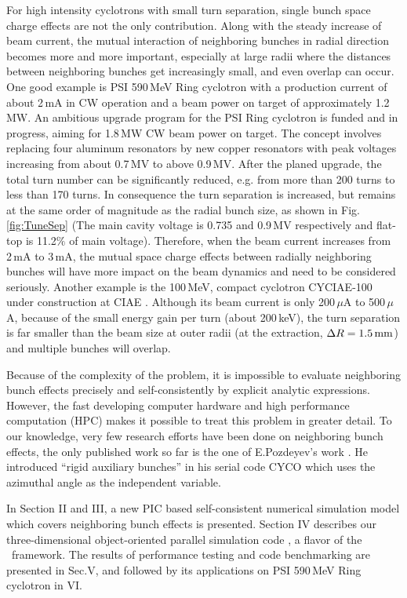 \documentclass[aps,prstab,twocolumn,superscriptaddress]{revtex4}
\begin{document}
For high intensity cyclotrons with small turn separation, single bunch space charge effects are not the only contribution. 
Along with the steady increase of beam current, the mutual interaction of neighboring bunches in radial direction 
becomes more and more important, especially at large radii where the distances between neighboring bunches get increasingly small, and even overlap can occur.
One good example is PSI 590\,MeV Ring cyclotron \cite{Mike:1} with a production current of about 2\,mA in CW operation and a beam power on target of approximately 1.2\,MW.
An ambitious upgrade program for the PSI Ring cyclotron is funded and in progress, aiming for 1.8\,MW CW beam power on target. 
The concept involves replacing four aluminum resonators by new copper resonators with peak voltages
increasing from about 0.7\,MV to above 0.9\,MV. After the planed upgrade, the total turn number can be significantly reduced, e.g. from more than 200 turns to less than 
170 turns.
In consequence the turn separation is increased, but remains at the same order of magnitude as the radial bunch size, as shown in Fig.\,\ref{fig:TuneSep} (The main cavity voltage is 0.735 and 0.9\,MV respectively and
      flat-top is 11.2$\%$ of main voltage).
Therefore, when the beam current increases from 2\,mA to 3\,mA, 
the mutual space charge effects between radially neighboring bunches will have more impact on the beam dynamics and need to be considered seriously.
Another example is the 100\,MeV, compact cyclotron CYCIAE-100 under construction at CIAE \cite{Zhang:1}. Although its beam current is only 200\,$\mu$A to 500\,$\mu$A,
because of the small energy gain per turn (about 200\,keV), the turn separation is far smaller than the beam size at outer radii (at the extraction, $\Delta R = 1.5\RM{\,mm}$) and
multiple bunches will overlap.

Because of the complexity of the problem, it is impossible to evaluate neighboring bunch effects precisely and self-consistently by explicit 
analytic expressions. However, the fast developing computer hardware and high performance computation (HPC) makes it possible to 
treat this problem in greater detail. To our knowledge, very few research efforts have been done on neighboring bunch effects, the only published work so far is the one of   
E.Pozdeyev's work \cite{Poz:1}. He introduced ``rigid auxiliary bunches'' in his serial code CYCO which uses the azimuthal angle as the independent variable. 

In Section II and III, a new PIC based self-consistent numerical simulation model which covers neighboring bunch effects is presented. 
Section IV describes our three-dimensional object-oriented parallel simulation code \opalcycl, a flavor of the \opal \  framework. 
The results of performance testing and code benchmarking are presented in Sec.V, and followed by its applications on PSI 590\,MeV Ring cyclotron in VI. 
\end{document}

